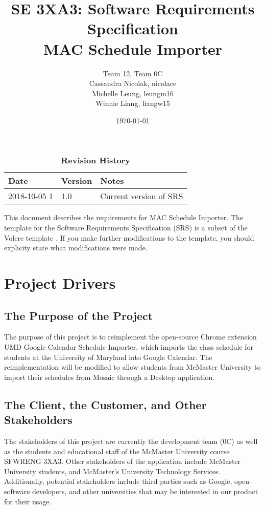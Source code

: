 \documentclass[12pt, titlepage]{article}
\title{SE 3XA3: Software Requirements Specification\\MAC Schedule Importer}
\author{Team 12, Team 0C
		\\ Cassandra Nicolak, nicolace
		\\ Michelle Leung, leungm16
		\\ Winnie Liang, liangw15
}
\date{\today}
\begin{document}
\maketitle

\tableofcontents
\listoftables
\listoffigures


\begin{table}[bp]
\caption{\bf Revision History}
\begin{tabularx}{\textwidth}{p{3cm}p{2cm}X}
\toprule {\bf Date} & {\bf Version} & {\bf Notes}\\
\midrule
2018-10-05 1 & 1.0 & Current version of SRS\\
\bottomrule
\end{tabularx}
\end{table}

\newpage


This document describes the requirements for MAC Schedule Importer.  The template for the Software
Requirements Specification (SRS) is a subset of the Volere
template  \cite{volere}.  If you make further modifications
to the template, you should explicity state what modifications were made.

\section{Project Drivers}

\subsection{The Purpose of the Project}
\hspace{5mm}The purpose of this project is to reimplement the open-source Chrome extension UMD Google Calendar Schedule Importer, which imports the class schedule for students at the University of Maryland into Google Calendar. The reimplementation will be modified to allow students from McMaster University to import their schedules from Mosaic through a Desktop application.

\subsection{The Client, the Customer, and Other Stakeholders}
\hspace{5mm}The stakeholders of this project are currently the development team (0C) as well as the students and educational staff of the McMaster University course SFWRENG 3XA3. Other stakeholders of the application include McMaster University students, and McMaster's University Technology Services.  Additionally, potential stakeholders include third parties such as Google, open-software developers, and other universities that may be interested in our product for their usage.
\end{document}

